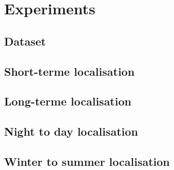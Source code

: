 \section{Experiments}
\label{sec:results}
\subsection{Dataset}
\cite{Maddern2016}

\subsection{Short-terme localisation}
\label{subsec:short-term}

\subsection{Long-terme localisation}
\label{subsec:long-term}

\subsection{Night to day localisation}
\label{subsec:night_loc}

\subsection{Winter to summer localisation}
\label{subsec:winter_loc}
